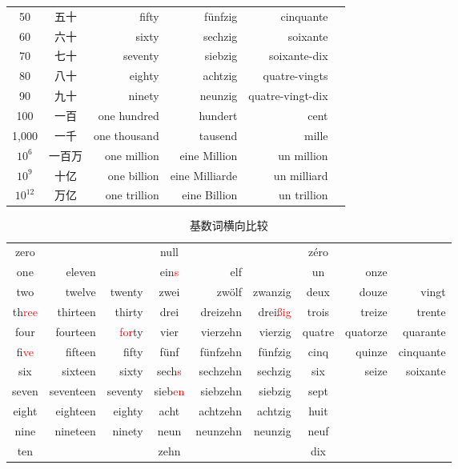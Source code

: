 \documentclass[12pt,A4paper,oneside,reqno]{amsart}
\numberwithin{equation}{section}
\theoremstyle{plain}
\theoremstyle{plain}
\theoremstyle{plain}
\numberwithin{equation}{section}
\theoremstyle{remark}
\begin{document}
\begin{longtable}{c|c|r|r|r|c}
50	&	五十	&	fifty	&	f\"{u}nfzig	&	cinquante	&		\\
60	&	六十	&	sixty	&	sechzig	&	soixante	&		\\
70	&	七十	&	seventy	&	siebzig	&	soixante-dix	&		\\
80	&	八十	&	eighty	&	achtzig	&	quatre-vingts	&		\\
90	&	九十	&	ninety	&	neunzig	&	quatre-vingt-dix	&		\\
100	&	一百	&	one hundred	&	hundert	&	cent	&		\\
1,000	&	一千	&	one thousand	&	tausend	&	mille	&		\\
$10^6$	&	一百万	&	one million	&	eine Million	&	un million	&		\\
$10^9$	&	十亿	&	one billion	&	eine Milliarde	&	un milliard	&		\\
$10^{12}$	&	万亿	&	one trillion	&	eine Billion	&	un trillion	&		\\


\hline
\end{longtable}

\begin{table}[th]
	\begin{tabular}{c|r|r|c|r|r|c|r|r}
		\hline
zero	&		&		&	null	&		&		&	zéro	&		&		\\
one	&	eleven	&		&	ein\textcolor{red}{s}	&	elf	&		&	un	&	onze	&		\\
two	&	twelve	&	twenty	&	zwei	&	zwölf	&	zwanzig	&	deux	&	douze	&	vingt	\\
\Xhline{0.3pt}																	
th\textcolor{red}{ree}	&	thirteen	&	thirty	&	drei	&	dreizehn	&	drei\textcolor{red}{\ss ig}	&	trois	&	treize	&	trente	\\
four	&	fourteen	&	\textcolor{red}{for}ty	&	vier	&	vierzehn	&	vierzig	&	quatre	&	quatorze	&	quarante	\\
fi\textcolor{red}{ve}	&	fifteen	&	fifty	&	fünf	&	fünfzehn	&	f\"{u}nfzig	&	cinq	&	quinze	&	cinquante	\\
six	&	sixteen	&	sixty	&	sech\textcolor{red}{s}	&	sechzehn	&	sechzig	&	six	&	seize	&	soixante	\\
seven	&	seventeen	&	seventy	&	sieb\textcolor{red}{en}	&	siebzehn	&	siebzig	&	sept	&		&		\\
eight	&	eighteen	&	eighty	&	acht	&	achtzehn	&	achtzig	&	huit	&		&		\\
nine	&	nineteen	&	ninety	&	neun	&	neunzehn	&	neunzig	&	neuf	&		&		\\
ten	&		&		&	zehn	&		&		&	dix	&		&		\\


		
		\hline
	\end{tabular}
	\vspace{0.5cm}
	\caption{基数词横向比较}
	\label{fig:number2}
\end{table}
\end{document}
